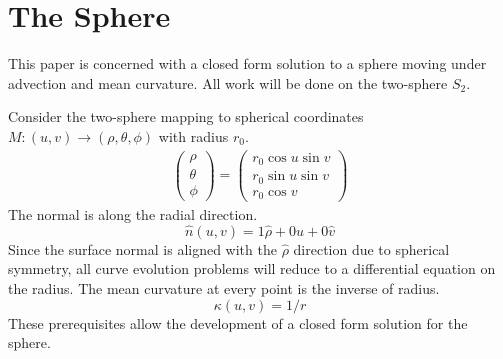 \documentclass[journal]{IEEEtran}
\begin{document}
\section{The Sphere}
This paper is concerned with a closed form solution to a sphere moving under advection and mean curvature.
All work will be done on the two-sphere $S_2$.

Consider the two-sphere mapping to spherical coordinates $M \colon (u,v) \rightarrow (\rho, \theta, \phi)$ with radius $r_0$.
\begin{align}
  \label{eqn:sphere:mapping}
  \begin{pmatrix}
    \rho \\
    \theta \\
    \phi
  \end{pmatrix} = 
  \begin{pmatrix}
    r_0 \cos u \sin v \\
    r_0 \sin u \sin v \\
    r_0 \cos v
  \end{pmatrix}
\end{align}
The normal is along the radial direction.
\begin{equation}
  \label{eqn:sphere:normal}
  \hat{n}(u,v) = 1\hat{\rho} + 0 \hat{u} + 0 \hat{v}
\end{equation}
Since the surface normal is aligned with the $\hat{\rho}$ direction due to spherical symmetry, all curve evolution problems will reduce to a differential equation on the radius.
The mean curvature at every point is the inverse of radius.
\begin{equation}
  \label{eqn:sphere:curvature}
  \kappa(u,v) = 1/r
\end{equation}
These prerequisites allow the development of a closed form solution for the sphere.
\end{document}
